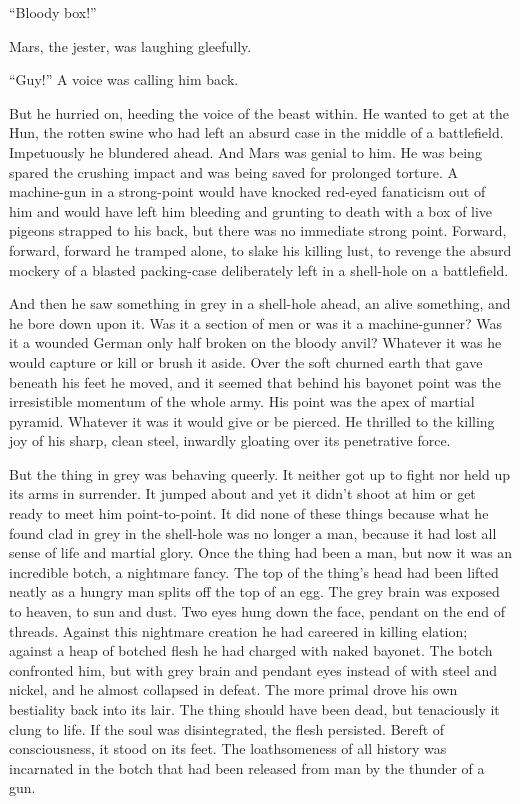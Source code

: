 ``Bloody box!''

Mars, the jester, was laughing gleefully.

``Guy!'' A voice was calling him back.

But he hurried on, heeding the voice of the beast within. He wanted to get at the Hun, the rotten swine who had left an absurd case in the middle of a battlefield. Impetuously he blundered ahead. And Mars was genial to him. He was being spared the crushing impact and was being saved for prolonged torture. A machine-gun in a strong-point would have knocked red-eyed fanaticism out of him and would have left him bleeding and grunting to death with a box of live pigeons strapped to his back, but there was no immediate strong point. Forward, forward, forward he tramped alone, to slake his killing lust, to revenge the absurd mockery of a blasted packing-case deliberately left in a shell-hole on a battlefield.

And then he saw something in grey in a shell-hole ahead, an alive something, and he bore down upon it. Was it a section of men or was it a machine-gunner? Was it a wounded German only half broken on the bloody anvil? Whatever it was he would capture or kill or brush it aside. Over the soft churned earth that gave beneath his feet he moved, and it seemed that behind his bayonet point was the irresistible momentum of the whole army. His point was the apex of martial pyramid. Whatever it was it would give or be pierced. He thrilled to the killing joy of his sharp, clean steel, inwardly gloating over its penetrative force.

But the thing in grey was behaving queerly. It neither got up to fight nor held up its arms in surrender. It jumped about and yet it didn't shoot at him or get ready to meet him point-to-point. It did none of these things because what he found clad in grey in the shell-hole was no longer a man, because it had lost all sense of life and martial glory. Once the thing had been a man, but now it was an incredible botch, a nightmare fancy. The top of the thing's head had been lifted neatly as a hungry man splits off the top of an egg. The grey brain was exposed to heaven, to sun and dust. Two eyes hung down the face, pendant on the end of threads. Against this nightmare creation he had careered in killing elation; against a heap of botched flesh he had charged with naked bayonet. The botch confronted him, but with grey brain and pendant eyes instead of with steel and nickel, and he almost collapsed in defeat. The more primal drove his own bestiality back into its lair. The thing should have been dead, but tenaciously it clung to life. If the soul was disintegrated, the flesh persisted. Bereft of consciousness, it stood on its feet. The loathsomeness of all history was incarnated in the botch that had been released from man by the thunder of a gun.

